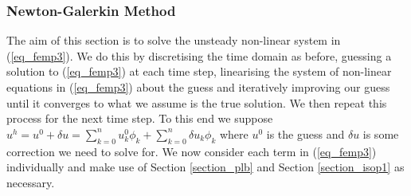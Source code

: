 \documentclass[11pt,fleqn]{article}
\theoremstyle{defstyle}
\begin{document}
\subsubsection{Newton-Galerkin Method}
The aim of this section is to solve the unsteady non-linear system in (\ref{eq_femp3}). We do this by discretising the time domain as before, guessing a solution to (\ref{eq_femp3}) at each time step, linearising the system of non-linear equations in (\ref{eq_femp3}) about the guess and iteratively improving our guess until it converges to what we assume is the true solution. We then repeat this process for the next time step. To this end we suppose $u^h = u^0 + \delta u = \sum_{k=0}^n u^0_k\phi_k + \sum_{k=0}^n \delta u_k\phi_k$ where $u^0$ is the guess and $\delta u$ is some correction we need to solve for. We now consider each term in (\ref{eq_femp3}) individually and make use of Section \ref{section_plb} and Section \ref{section_isop1} as necessary.
\end{document}
